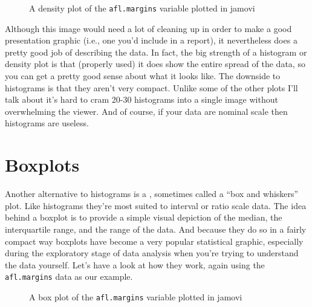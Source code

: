 \begin{figure}[ht]
\begin{center}
\caption{A density plot of the \texttt{afl.margins} variable plotted in jamovi}
\label{fig:histogram2}
\end{center}
\end{figure}

Although this image would need a lot of cleaning up in order to make a good presentation graphic (i.e., one you'd include in a report), it nevertheless does a pretty good job of describing the data. In fact, the big strength of a histogram or density plot is that (properly used) it does show the entire spread of the data, so you can get a pretty good sense about what it looks like. The downside to histograms is that they aren't very compact. Unlike some of the other plots I'll talk about it's hard to cram 20-30 histograms into a single image without overwhelming the viewer. And of course, if your data are nominal scale then histograms are useless.


\section{Boxplots~\label{sec:boxplots}}

Another alternative to histograms is a , sometimes called a ``box and whiskers'' plot. Like histograms they're most suited to interval or ratio scale data. The idea behind a boxplot is to provide a simple visual depiction of the median, the interquartile range, and the range of the data. And because they do so in a fairly compact way boxplots have become a very popular statistical graphic, especially during the exploratory stage of data analysis when you're trying to understand the data yourself. Let's have a look at how they work, again using the \texttt{afl.margins} data as our example.

\begin{figure}[!!htb]
\begin{center}
\caption{A box plot of the \texttt{afl.margins} variable plotted in jamovi}
\label{fig:boxplot1}
\end{center}
\end{figure}
 
